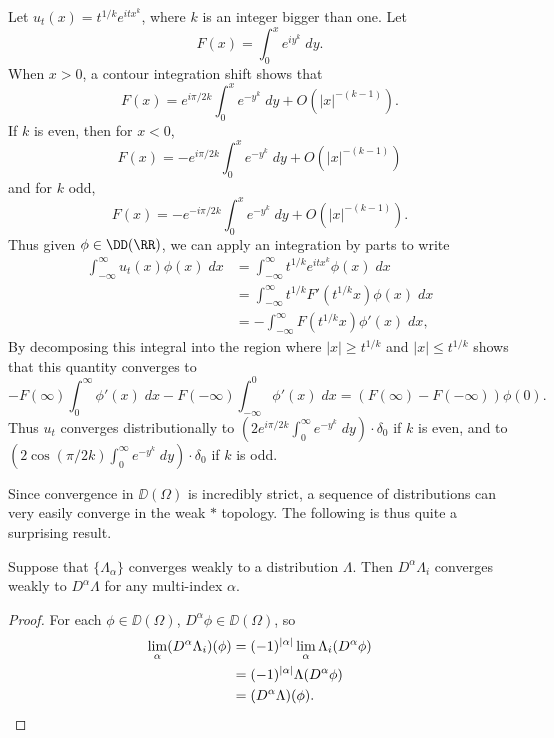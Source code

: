 \begin{example}
    Let $u_t(x) = t^{1/k} e^{itx^k}$, where $k$ is an integer bigger than one. Let
    \[ F(x) = \int_0^x e^{iy^k}\; dy. \]
    When $x > 0$, a contour integration shift shows that
    \[ F(x) = e^{i \pi / 2k} \int_0^x e^{-y^k}\; dy + O(|x|^{-(k-1)}). \]
    If $k$ is even, then for $x < 0$,
    \[ F(x) = - e^{i \pi / 2k} \int_0^x e^{-y^k}\; dy + O(|x|^{-(k-1)}) \]
    and for $k$ odd,
    \[ F(x) = - e^{-i \pi / 2k} \int_0^x e^{-y^k}\; dy + O(|x|^{-(k-1)}). \]
    Thus given $\phi \in \DD(\RR)$, we can apply an integration by parts to write
    \begin{align*}
        \int_{-\infty}^\infty u_t(x) \phi(x)\; dx &= \int_{-\infty}^\infty t^{1/k} e^{itx^k} \phi(x)\; dx \\
        &= \int_{-\infty}^\infty t^{1/k} F'(t^{1/k} x) \phi(x)\; dx\\
        &= - \int_{-\infty}^\infty F(t^{1/k} x) \phi'(x)\; dx,
     \end{align*}
     By decomposing this integral into the region where $|x| \geq t^{1/k}$ and $|x| \leq t^{1/k}$ shows that this quantity converges to
     \[ - F(\infty) \int_0^\infty \phi'(x)\; dx - F(-\infty) \int_{-\infty}^0 \phi'(x)\; dx = (F(\infty) - F(-\infty)) \phi(0). \]
     Thus $u_t$ converges distributionally to $\left( 2 e^{i \pi / 2k} \int_0^\infty e^{-y^k}\; dy \right) \cdot \delta_0$ if $k$ is even, and to $\left( 2 \cos(\pi / 2k) \int_0^\infty e^{-y^k}\; dy \right) \cdot \delta_0$ if $k$ is odd.
\end{example}

Since convergence in $\DD(\Omega)$ is incredibly strict, a sequence of distributions can very easily converge in the weak $*$ topology. The following is thus quite a surprising result.

\begin{theorem}
  Suppose that $\{ \Lambda_\alpha \}$ converges weakly to a distribution $\Lambda$. Then $D^\alpha \Lambda_i$ converges weakly to $D^\alpha \Lambda$ for any multi-index $\alpha$.
\end{theorem}
\begin{proof}
  For each $\phi \in \DD(\Omega)$, $D^\alpha \phi \in \DD(\Omega)$, so
  \begin{align*}
    \lim_\alpha (D^\alpha \Lambda_i)(\phi) &= (-1)^{|\alpha|} \lim_\alpha \Lambda_i(D^\alpha \phi)\\
    &= (-1)^{|\alpha|} \Lambda(D^\alpha \phi)\\
    &= (D^\alpha \Lambda)(\phi). \qedhere
  \end{align*}
\end{proof}

